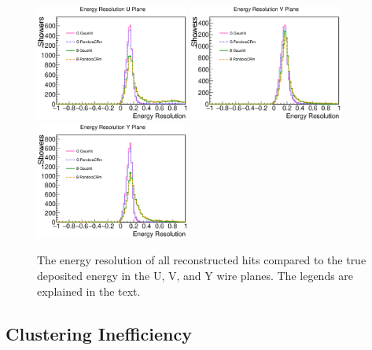 \begin{figure}[htbp]
\begin{center}
\includegraphics[width=0.45\textwidth]{figs/ongoing/energy/EnergyResU.eps}
\includegraphics[width=0.45\textwidth]{figs/ongoing/energy/EnergyResV.eps}
\includegraphics[width=0.45\textwidth]{figs/ongoing/energy/EnergyResY.eps}
\caption{The energy resolution of all reconstructed hits compared to the
true deposited energy in the U, V, and Y wire planes.
The legends are explained in the text.}
\label{fig:energy_deficiency}
\end{center}
\end{figure}


\subsection{Clustering Inefficiency}
\label{sec:clustering_ineff}

